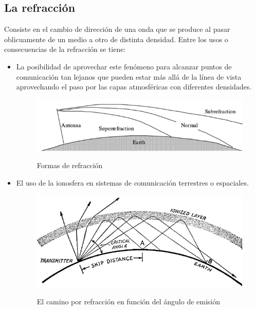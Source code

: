 \subsection{La refracción}
Consiste en el cambio de dirección de una onda que se produce al pasar oblicuamente de un medio a otro de distinta densidad. Entre los usos o consecuencias de la refracción se tiene: \\

\begin{itemize}
	\item    La posibilidad de aprovechar este fenómeno para alcanzar puntos de comunicación tan lejanos que pueden estar más allá de la línea de vista aprovechando el paso por las capas atmosféricas con diferentes densidades.
	
	\begin{figure}[h!]
		\captionsetup{justification = raggedright, singlelinecheck = false}
		\caption{Formas de refracción} 
		\centering
		\includegraphics[scale=1]{Imagenes/Earth.png}
		\label{fig:Earth}
	\end{figure}
	\item  El uso de la ionosfera en sistemas de comunicación terrestres o espaciales.
	
	\begin{figure}[h!]
		\captionsetup{justification = raggedright, singlelinecheck = false}
		\caption{El camino por refracción en función del ángulo de emisión} 
		\centering
		\includegraphics[scale=1]{Imagenes/Ionosfera.png}
		\label{fig:Ionosfera}
	\end{figure}
\end{itemize}


